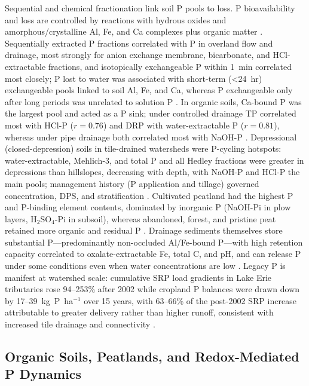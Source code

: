 \documentclass[11pt]{article}
\begin{document}
Sequential and chemical fractionation link soil P pools to loss. P bioavailability and
loss are controlled by reactions with hydrous oxides and amorphous/crystalline Al, Fe,
and Ca complexes plus organic matter \parencite{Sharpley1995}. Sequentially extracted P
fractions correlated with P in overland flow and drainage, most strongly for anion
exchange membrane, bicarbonate, and HCl-extractable fractions, and isotopically
exchangeable P within 1~min correlated most closely; P lost to water was associated with
short-term (\textless24~hr) exchangeable pools linked to soil Al, Fe, and Ca, whereas P
exchangeable only after long periods was unrelated to solution P
\parencite{McDowell2001}. In organic soils, Ca-bound P was the largest pool and acted as a
P sink; under controlled drainage TP correlated most with HCl-P ($r=0.76$) and DRP with
water-extractable P ($r=0.81$), whereas under pipe drainage both correlated most with
NaOH-P \parencite{Grenon2022,Grenon2021}. Depressional (closed-depression) soils in
tile-drained watersheds were P-cycling hotspots: water-extractable, Mehlich-3, and total P
and all Hedley fractions were greater in depressions than hillslopes, decreasing with
depth, with NaOH-P and HCl-P the main pools; management history (P application and tillage)
governed concentration, DPS, and stratification \parencite{Mumbi2024}. Cultivated peatland
had the highest P and P-binding element contents, dominated by inorganic P (NaOH-Pi in plow
layers, H$_2$SO$_4$-Pi in subsoil), whereas abandoned, forest, and pristine peat retained
more organic and residual P \parencite{Höyhtyä2025}. Drainage sediments themselves store
substantial P---predominantly non-occluded Al/Fe-bound P---with high retention capacity
correlated to oxalate-extractable Fe, total C, and pH, and can release P under some
conditions even when water concentrations are low \parencite{Nguyen2002}. Legacy P is
manifest at watershed scale: cumulative SRP load gradients in Lake Erie tributaries rose
94--253\% after 2002 while cropland P balances were drawn down by 17--39~kg~P~ha$^{-1}$ over
15 years, with 63--66\% of the post-2002 SRP increase attributable to greater delivery
rather than higher runoff, consistent with increased tile drainage and connectivity
\parencite{Jarvie2017}.

\subsection{Organic Soils, Peatlands, and Redox-Mediated P Dynamics}
\end{document}
